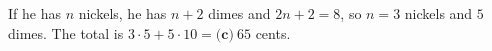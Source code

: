 If he has $n$ nickels, he has $n+2$ dimes and $2n+2=8$, so $n=3$ nickels and $5$ dimes. The total is $3\cdot5+5\cdot10=\boxed{\textbf{(c)}\ 65}$ cents.
